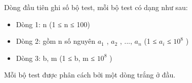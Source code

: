 Dòng đầu tiên ghi số bộ test, mỗi bộ test có dạng như sau:
\begin{itemize}
	\item Dòng 1: n (1 ≤ n ≤ 100)
	\item Dòng 2: gồm n số nguyên $a_{1}$ , $a_{2}$ , ..., $a_{n}$ (1 ≤ $a_{i}$ ≤ $10^{8}$ )
	\item Dòng 3: b, m (1 ≤ b, m ≤ $10^{8}$ )
\end{itemize}

Mỗi bộ test được phân cách bởi một dòng trắng ở đầu.
